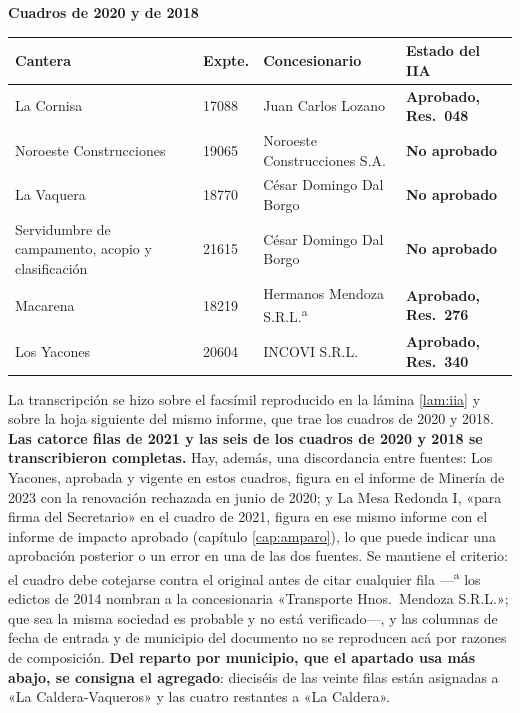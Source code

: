 {\sffamily\bfseries\footnotesize Cuadros de 2020 y de 2018\par}
\vspace{0.5em}
{\small
\setlength{\LTpre}{0.6em}\setlength{\LTpost}{1.2em}
\begin{longtable}{@{}p{3.0cm}p{1.1cm}p{4.0cm}p{3.4cm}@{}}
\toprule
\textbf{Cantera} & \textbf{Expte.} & \textbf{Concesionario} & \textbf{Estado del IIA} \\
\midrule
\endhead
La Cornisa & 17088 & Juan Carlos Lozano & \textbf{Aprobado, Res.\ 048} \\
Noroeste Construcciones & 19065 & Noroeste Construcciones S.A. & \textbf{No aprobado} \\
La Vaquera & 18770 & César Domingo Dal Borgo & \textbf{No aprobado} \\
Servidumbre de campamento, acopio y clasificación & 21615 & César Domingo Dal Borgo & \textbf{No aprobado} \\
\midrule
Macarena & 18219 & Hermanos Mendoza S.R.L.\textsuperscript{a} & \textbf{Aprobado, Res.\ 276} \\
Los Yacones & 20604 & INCOVI S.R.L. & \textbf{Aprobado, Res.\ 340} \\
\bottomrule
\end{longtable}
}

\begin{cautela}
La transcripción se hizo sobre el facsímil reproducido en la lámina \ref{lam:iia} y sobre la
hoja siguiente del mismo informe, que trae los cuadros de 2020 y 2018. \textbf{Las catorce filas
de 2021 y las seis de los cuadros de 2020 y 2018
se transcribieron completas.} Hay, además, una discordancia entre fuentes: Los Yacones, aprobada y vigente en estos cuadros, figura en el informe de Minería de 2023 con la renovación rechazada en junio de 2020; y La Mesa Redonda I, «para firma del Secretario» en el cuadro de 2021, figura en ese mismo informe con el informe de impacto aprobado (capítulo \ref{cap:amparo}), lo que puede indicar una aprobación posterior o un error en una de las dos fuentes. Se mantiene
el criterio: el cuadro debe cotejarse contra el original antes de citar cualquier fila ---\textsuperscript{a} los edictos de 2014 nombran a la concesionaria «Transporte Hnos.\ Mendoza S.R.L.»; que sea la misma sociedad es probable y no está verificado---, y las
columnas de fecha de entrada y de municipio del documento no se reproducen acá por razones de
composición. \textbf{Del reparto por municipio, que el apartado usa más abajo, se consigna el agregado}: dieciséis de las veinte filas están asignadas a «La Caldera-Vaqueros» y las cuatro restantes a «La Caldera».
\end{cautela}

